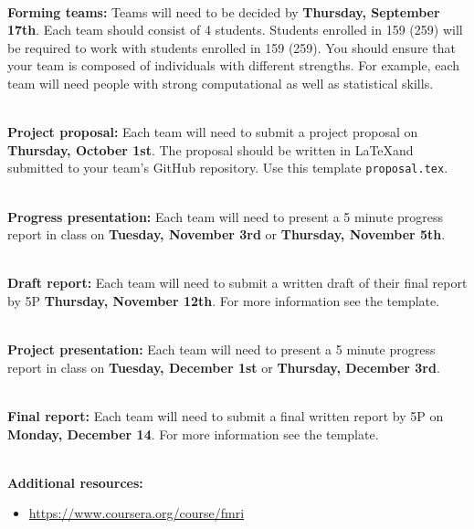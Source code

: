 \documentclass[11pt]{article}
\begin{document}
\textbf {\large \\ Forming teams:}
Teams will need to be decided by \textbf{Thursday, September 17th}.  Each team
should consist of 4 students.  Students enrolled in 159 (259) will be required to
work with students enrolled in 159 (259).  You should ensure that
your team is composed of individuals with different strengths.  For example,
each team will need people with strong computational as well as statistical skills.

\textbf {\large \\ Project proposal:}
Each team will need to submit a project proposal on \textbf{Thursday, October 1st}.
The proposal should be written in \LaTeX and submitted to your team's GitHub
repository.  Use this template \texttt{proposal.tex}.

\textbf {\large \\ Progress presentation:}
Each team will need to present a 5 minute progress report in class
on \textbf{Tuesday, November 3rd} or \textbf{Thursday,  November 5th}.

\textbf {\large \\ Draft report:}
Each team will need to submit a written draft of their final report by 5P
\textbf{Thursday, November 12th}.  For more information see the
template.

\textbf {\large \\ Project presentation:}
Each team will need to present a 5 minute progress report in class
on \textbf{Tuesday, December 1st} or \textbf{Thursday, December 3rd}.

\textbf {\large \\ Final report:}
Each team will need to submit a final written report by 5P on
\textbf{Monday, December 14}.  For more information see the
template.

\textbf {\large \\ Additional resources:}

\begin{itemize}
\item \url{https://www.coursera.org/course/fmri}
\end{itemize}
\end{document}
